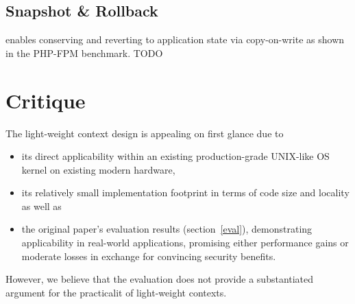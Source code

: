 \documentclass[10pt,twocolumn,letter]{article}
\begin{document}

\subsection{Snapshot \& Rollback}
enables conserving and reverting to application state via copy-on-write as shown in the PHP-FPM benchmark.
TODO

\section{Critique}\label{eval:crit}
The light-weight context design is appealing on first glance due to
\begin{itemize}
  \item its direct applicability within an existing production-grade UNIX-like OS kernel on existing modern hardware,
  \item its relatively small implementation footprint in terms of code size and locality as well as
  \item the original paper's evaluation results (section~\ref{eval}), demonstrating applicability in real-world applications, promising either performance gains or moderate losses in exchange for convincing security benefits.
\end{itemize}
However, we believe that the evaluation does not provide a substantiated argument for the practicalit of light-weight contexts.
\end{document}
